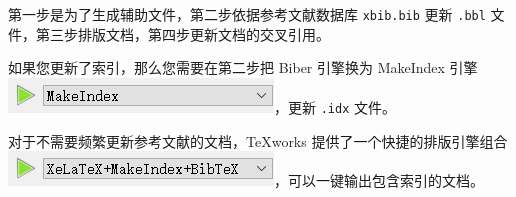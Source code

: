 第一步是为了生成辅助文件，第二步依据参考文献数据库 \texttt{xbib.bib} 更新 \texttt{.bbl} 文件，第三步排版文档，第四步更新文档的交叉引用。

如果您更新了索引，那么您需要在第二步把 Biber 引擎换为 MakeIndex 引擎 \includegraphics{Pictures/Appendix/pic_makeindex.png}，更新 \texttt{.idx} 文件。

对于不需要频繁更新参考文献的文档，TeXworks 提供了一个快捷的排版引擎组合 \includegraphics{Pictures/Appendix/pic_xelate_makeindex.png}，可以一键输出包含索引的文档。
